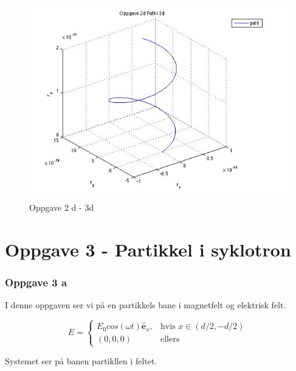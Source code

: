 \documentclass[12pt,a4paper,final,leqno]{report}
\begin{document}
\begin{figure}[H]
\caption{Oppgave 2 d - 3d}
\centering
\includegraphics[width=\textwidth]{oppgave2d3d.jpg}
\end{figure}



\chapter*{Oppgave 3 - Partikkel i syklotron}
\subsection*{Oppgave 3 a}
I denne oppgaven ser vi på en partikkels bane i magnetfelt og elektrisk felt.

$$E = \begin{cases} E_0cos(\omega t) \hat{\mathbf{e}}_x, & \mbox{hvis } x \in (d/2, -d/2) \\ (0, 0, 0) & \mbox{ellers}\end{cases}$$

Systemet ser på banen partikllen i feltet.
 
\end{document}
